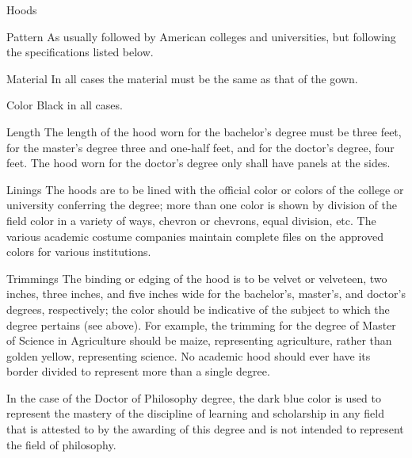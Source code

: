 \documentclass{tufte-handout}
\begin{document}
Hoods

Pattern
As usually followed by American colleges and universities, but following the specifications listed below.

Material
In all cases the material must be the same as that of the gown.
 
Color
Black in all cases.
 
Length
The length of the hood worn for the bachelor's degree must be three feet, for the master's degree three and one-half feet, and for the doctor's degree, four feet. The hood worn for the doctor's degree only shall have panels at the sides.
 
Linings
The hoods are to be lined with the official color or colors of the college or university conferring the degree; more than one color is shown by division of the field color in a variety of ways, chevron or chevrons, equal division, etc. The various academic costume companies maintain complete files on the approved colors for various institutions.
 
Trimmings
The binding or edging of the hood is to be velvet or velveteen, two inches, three inches, and five inches wide for the bachelor's, master's, and doctor's degrees, respectively; the color should be indicative of the subject to which the degree pertains (see above). For example, the trimming for the degree of Master of Science in Agriculture should be maize, representing agriculture, rather than golden yellow, representing science. No academic hood should ever have its border divided to represent more than a single degree.

In the case of the Doctor of Philosophy degree, the dark blue color is used to represent the mastery of the discipline of learning and scholarship in any field that is attested to by the awarding of this degree and is not intended to represent the field of philosophy.
\end{document}
